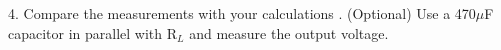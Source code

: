 {\begin{problem}
		4. Compare the measurements with your calculations
		. (Optional) Use a 470\(\mu\)F capacitor in parallel with R\(_{L}\) and measure the output voltage.

	\end{problem}
	
}
